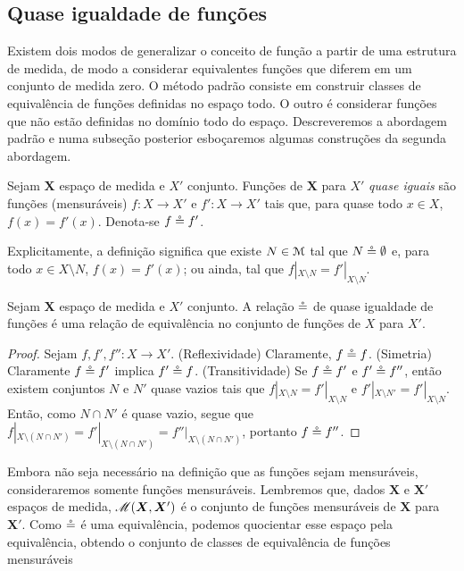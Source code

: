 \subsection{Quase igualdade de funções}

Existem dois modos de generalizar o conceito de função a partir de uma estrutura de medida, de modo a considerar equivalentes funções que diferem em um conjunto de medida zero. O método padrão consiste em construir classes de equivalência de funções definidas no espaço todo. O outro é considerar funções que não estão definidas no domínio todo do espaço. Descreveremos a abordagem padrão e numa subseção posterior esboçaremos algumas construções da segunda abordagem.

\begin{definition}
Sejam $\bm X$ espaço de medida e $X'$ conjunto. Funções de $\bm X$ para $X'$ \emph{quase iguais} são funções (mensuráveis) $f\colon X \to X'$ e $f'\colon X \to X'$ tais que, para quase todo $x \in X$, $f(x)=f'(x)$. Denota-se $f \circeq f'$.
\end{definition}

Explicitamente, a definição significa que existe $N \in \mathcal{M}$ tal que $N \circeq \emptyset$ e, para todo $x \in X \setminus N$, $f(x)=f'(x)$; ou ainda, tal que $f|_{X \setminus N} = f'|_{X \setminus N}$.

\begin{proposition}
Sejam $\bm X$ espaço de medida e $X'$ conjunto. A relação $\circeq$ de quase igualdade de funções é uma relação de equivalência no conjunto de funções de $X$ para $X'$.
\end{proposition}
\begin{proof}
Sejam $f,f',f''\colon X \to X'$. (Reflexividade) Claramente, $f \circeq f$. (Simetria) Claramente $f \circeq f'$ implica $f' \circeq f$. (Transitividade) Se $f \circeq f'$ e $f' \circeq f''$, então existem conjuntos $N$ e $N'$ quase vazios tais que $f|_{X \setminus N} = f'|_{X \setminus N}$ e $f'|_{X \setminus N'} = f'|_{X \setminus N}$. Então, como $N \cap N'$ é quase vazio, segue que $f|_{X \setminus (N \cap N')} = f'|_{X \setminus (N \cap N')} = f''|_{X \setminus (N \cap N')}$, portanto $f \circeq f''$.
\end{proof}

Embora não seja necessário na definição que as funções sejam mensuráveis, consideraremos somente funções mensuráveis. Lembremos que, dados $\bm X$ e $\bm X'$ espaços de medida, $\mathscr{M}(\bm X, \bm X')$ é o conjunto de funções mensuráveis de $\bm X$ para $\bm X'$. Como $\circeq$ é uma equivalência, podemos quocientar esse espaço pela equivalência, obtendo o conjunto de classes de equivalência de funções mensuráveis

